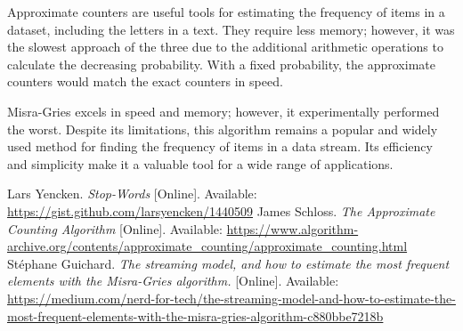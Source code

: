 \documentclass[]{revdetua}
\begin{document}
Approximate counters are useful tools for estimating the frequency of items in a dataset, including the letters in a text. They require less memory; however, it was the slowest approach of the three due to the additional arithmetic operations to calculate the decreasing probability. With a fixed probability, the approximate counters would match the exact counters in speed.

Misra-Gries excels in speed and memory; however, it experimentally performed the worst. Despite its limitations, this algorithm remains a popular and widely used method for finding the frequency of items in a data stream. Its efficiency and simplicity make it a valuable tool for a wide range of applications.

\begin{thebibliography}{00}

 Lars Yencken. \textit{Stop-Words} [Online]. Available: \url{https://gist.github.com/larsyencken/1440509}
 James Schloss. \textit{The Approximate Counting Algorithm} [Online]. Available: \url{https://www.algorithm-archive.org/contents/approximate_counting/approximate_counting.html}
 Stéphane Guichard. \textit{The streaming model, and how to estimate the most frequent elements with the Misra-Gries algorithm.} [Online]. Available: \url{https://medium.com/nerd-for-tech/the-streaming-model-and-how-to-estimate-the-most-frequent-elements-with-the-misra-gries-algorithm-c880bbe7218b}

\end{thebibliography}
\end{document}
